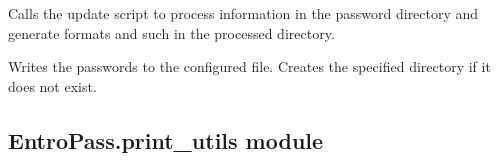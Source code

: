 \documentclass[letterpaper,10pt,english]{sphinxmanual}
\begin{document}
\begin{fulllineitems}
\begin{fulllineitems}
\label{\detokenize{EntroPass:EntroPass.entropass.EntroPass.run_update}}
\sphinxAtStartPar
Calls the update script to process information in the password directory and generate
formats and such in the processed directory.

\end{fulllineitems}


\begin{fulllineitems}
\label{\detokenize{EntroPass:EntroPass.entropass.EntroPass.scored_pwds}}
\end{fulllineitems}


\begin{fulllineitems}
\label{\detokenize{EntroPass:EntroPass.entropass.EntroPass.write_t_file}}
\sphinxAtStartPar
Writes the passwords to the configured file. Creates the specified directory if it
does not exist.

\end{fulllineitems}


\end{fulllineitems}



\subsection{EntroPass.print\_utils module}
\label{\detokenize{EntroPass:module-EntroPass.print_utils}}\label{\detokenize{EntroPass:entropass-print-utils-module}}
\end{document}
